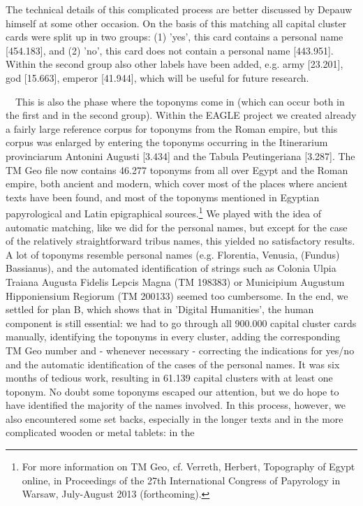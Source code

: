 \documentclass[amsthm,ebook]{saparticle}
\begin{document}
\bigskip

The technical details of this complicated process are better discussed by Depauw himself at some other occasion. On the
basis of this matching all capital cluster cards were split up in two groups: (1) 'yes', this card contains a personal
name [454.183], and (2) 'no', this card does not contain a personal name [443.951]. Within the second group also other
labels have been added, e.g. army [23.201], god [15.663], emperor [41.944], which will be useful for future research.

\ \ This is also the phase where the toponyms come in (which can occur both in the first and in the second group).
Within the EAGLE project we created already a fairly large reference corpus for toponyms from the Roman empire, but
this corpus was enlarged by entering the toponyms occurring in the Itinerarium provinciarum Antonini Augusti [3.434]
and the Tabula Peutingeriana [3.287]. The TM Geo file now contains 46.277 toponyms from all over Egypt and the Roman
empire, both ancient and modern, which cover most of the places where ancient texts have been found, and most of the
toponyms mentioned in Egyptian papyrological and Latin epigraphical sources.\footnote{ For more information on TM Geo,
cf. Verreth, Herbert, Topography of Egypt online, in Proceedings of the 27th International Congress of Papyrology in
Warsaw, July-August 2013 (forthcoming).} We played with the idea of automatic matching, like we did for the personal
names, but except for the case of the relatively straightforward tribus names, this yielded no satisfactory results. A
lot of toponyms resemble personal names (e.g. Florentia, Venusia, (Fundus) Bassianus), and the automated identification
of strings such as Colonia Ulpia Traiana Augusta Fidelis Lepcis Magna (TM 198383) or Municipium Augustum Hipponiensium
Regiorum (TM 200133) seemed too cumbersome. In the end, we settled for plan B, which shows that in 'Digital
Humanities', the human component is still essential: we had to go through all 900.000 capital cluster cards manually,
identifying the toponyms in every cluster, adding the corresponding TM Geo number and - whenever necessary - correcting
the indications for yes/no and the automatic identification of the cases of the personal names. It was six months of
tedious work, resulting in 61.139 capital clusters with at least one toponym. No doubt some toponyms escaped our
attention, but we do hope to have identified the majority of the names involved. In this process, however, we also
encountered some set backs, especially in the longer texts and in the more complicated wooden or metal tablets: in the
\end{document}
